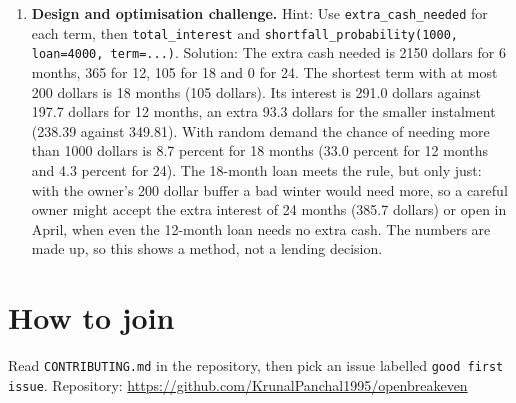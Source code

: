 \documentclass[11pt,a4paper]{article}
\begin{document}
\begin{enumerate}[nosep]
\item \textbf{Design and optimisation challenge.} Hint: Use \texttt{extra\_cash\_needed} for each term, then \texttt{total\_interest} and \texttt{shortfall\_probability(1000, loan=4000, term=...)}. Solution: The extra cash needed is 2150 dollars for 6 months, 365 for 12, 105 for 18 and 0 for 24. The shortest term with at most 200 dollars is 18 months (105 dollars). Its interest is 291.0 dollars against 197.7 dollars for 12 months, an extra 93.3 dollars for the smaller instalment (238.39 against 349.81). With random demand the chance of needing more than 1000 dollars is 8.7 percent for 18 months (33.0 percent for 12 months and 4.3 percent for 24). The 18-month loan meets the rule, but only just: with the owner's 200 dollar buffer a bad winter would need more, so a careful owner might accept the extra interest of 24 months (385.7 dollars) or open in April, when even the 12-month loan needs no extra cash. The numbers are made up, so this shows a method, not a lending decision.
\end{enumerate}

\section{How to join}
Read \texttt{CONTRIBUTING.md} in the repository, then pick an issue labelled \texttt{good first issue}. Repository: \url{https://github.com/KrunalPanchal1995/openbreakeven}
\end{document}
